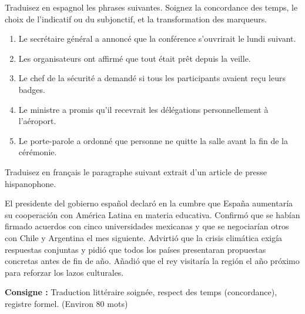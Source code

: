 \documentclass[11pt]{article}
\begin{document}
\begin{exercice}
Traduisez en espagnol les phrases suivantes. Soignez la concordance des temps, le choix de l'indicatif ou du subjonctif, et la transformation des marqueurs.
\begin{enumerate}
\item Le secrétaire général a annoncé que la conférence s'ouvrirait le lundi suivant.
\item Les organisateurs ont affirmé que tout était prêt depuis la veille.
\item Le chef de la sécurité a demandé si tous les participants avaient reçu leurs badges.
\item Le ministre a promis qu'il recevrait les délégations personnellement à l'aéroport.
\item Le porte-parole a ordonné que personne ne quitte la salle avant la fin de la cérémonie.
\end{enumerate}
\end{exercice}

\begin{exercice}
Traduisez en français le paragraphe suivant extrait d'un article de presse hispanophone.
\begin{textebox}
El presidente del gobierno español declaró en la cumbre que España aumentaría su cooperación con América Latina en materia educativa. Confirmó que se habían firmado acuerdos con cinco universidades mexicanas y que se negociarían otros con Chile y Argentina el mes siguiente. Advirtió que la crisis climática exigía respuestas conjuntas y pidió que todos los países presentaran propuestas concretas antes de fin de año. Añadió que el rey visitaría la región el año próximo para reforzar los lazos culturales.
\end{textebox}
\textbf{Consigne :} Traduction littéraire soignée, respect des temps (concordance), registre formel. (Environ 80 mots)
\end{exercice}
\end{document}

